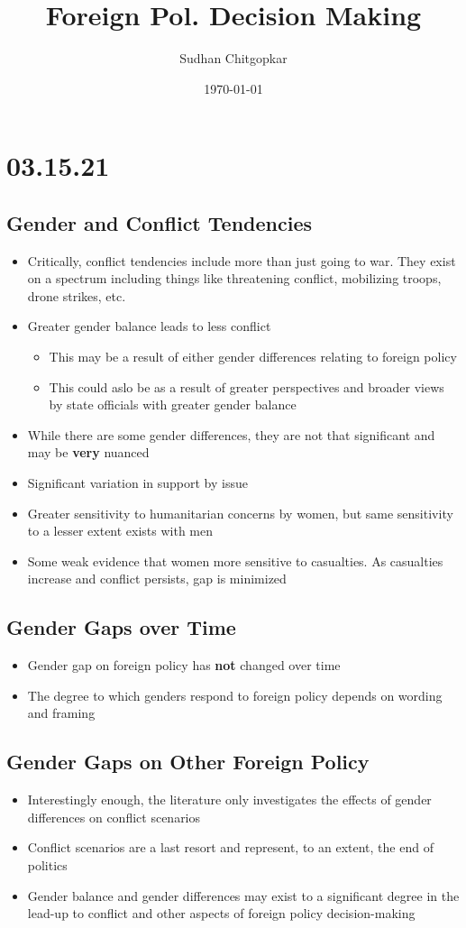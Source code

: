 \documentclass[11pt]{article}
\author{Sudhan Chitgopkar}
\date{\today}
\title{Foreign Pol. Decision Making}
\begin{document}
\maketitle
\section*{03.15.21}
\label{sec:orgc9d6792}
\subsection*{Gender and Conflict Tendencies}
\label{sec:org29794a4}
\begin{itemize}
\item Critically, conflict tendencies include more than just going to war. They exist on a spectrum including things like threatening conflict, mobilizing troops, drone strikes, etc.
\item Greater gender balance leads to less conflict
\begin{itemize}
\item This may be a result of either gender differences relating to foreign policy
\item This could aslo be as a result of greater perspectives and broader views by state officials with greater gender balance
\end{itemize}
\item While there are some gender differences, they are not that significant and may be \textbf{very} nuanced
\item Significant variation in support by issue
\item Greater sensitivity to humanitarian concerns by women, but same sensitivity to a lesser extent exists with men
\item Some weak evidence that women more sensitive to casualties. As casualties increase and conflict persists, gap is minimized
\end{itemize}
\subsection*{Gender Gaps over Time}
\label{sec:org5ce35b5}
\begin{itemize}
\item Gender gap on foreign policy has \textbf{not} changed over time
\item The degree to which genders respond to foreign policy depends on wording and framing
\end{itemize}
\subsection*{Gender Gaps on Other Foreign Policy}
\label{sec:orga61cf6a}
\begin{itemize}
\item Interestingly enough, the literature only investigates the effects of gender differences on conflict scenarios
\item Conflict scenarios are a last resort and represent, to an extent, the end of politics
\item Gender balance and gender differences may exist to a significant degree in the lead-up to conflict and other aspects of foreign policy decision-making
\end{itemize}
\end{document}
